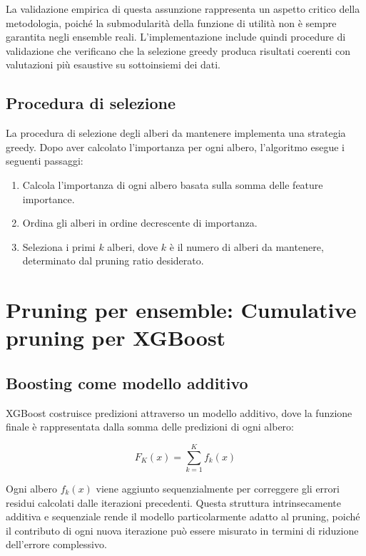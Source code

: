 \documentclass[a4paper,12pt]{report}
\begin{document}
	La validazione empirica di questa assunzione rappresenta un aspetto critico della metodologia, poiché la submodularità della funzione di utilità non è sempre garantita negli ensemble reali. L'implementazione include quindi procedure di validazione che verificano che la selezione greedy produca risultati coerenti con valutazioni più esaustive su sottoinsiemi dei dati.
	
	\subsection{Procedura di selezione}
	La procedura di selezione degli alberi da mantenere implementa una strategia greedy. Dopo aver calcolato l'importanza per ogni albero, l'algoritmo esegue i seguenti passaggi:
	\begin{enumerate}
		\item Calcola l'importanza di ogni albero basata sulla somma delle feature importance.
		\item Ordina gli alberi in ordine decrescente di importanza.
		\item Seleziona i primi $k$ alberi, dove $k$ è il numero di alberi da mantenere, determinato dal pruning ratio desiderato.
	\end{enumerate}
	
	\section{Pruning per ensemble: Cumulative pruning per XGBoost}
	
	\subsection{Boosting come modello additivo}
	XGBoost costruisce predizioni attraverso un modello additivo, dove la funzione finale è rappresentata dalla somma delle predizioni di ogni albero:
	
	\[
	F_K(x) = \sum_{k=1}^K f_k(x)
	\]
	
	Ogni albero $f_k(x)$ viene aggiunto sequenzialmente per correggere gli errori residui calcolati dalle iterazioni precedenti. Questa struttura intrinsecamente additiva e sequenziale rende il modello particolarmente adatto al pruning, poiché il contributo di ogni nuova iterazione può essere misurato in termini di riduzione dell'errore complessivo.
	
\end{document}
